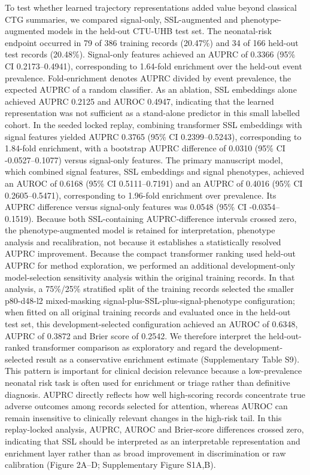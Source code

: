 \documentclass[utf8]{FrontiersinHarvard}
\begin{document}
To test whether learned trajectory representations added value beyond classical CTG summaries, we compared signal-only, SSL-augmented and phenotype-augmented models in the held-out CTU-UHB test set. The neonatal-risk endpoint occurred in 79 of 386 training records (20.47\%) and 34 of 166 held-out test records (20.48\%). Signal-only features achieved an AUPRC of 0.3366 (95\% CI 0.2173--0.4941), corresponding to 1.64-fold enrichment over the held-out event prevalence. Fold-enrichment denotes AUPRC divided by event prevalence, the expected AUPRC of a random classifier. As an ablation, SSL embeddings alone achieved AUPRC 0.2125 and AUROC 0.4947, indicating that the learned representation was not sufficient as a stand-alone predictor in this small labelled cohort. In the seeded locked replay, combining transformer SSL embeddings with signal features yielded AUPRC 0.3765 (95\% CI 0.2399--0.5243), corresponding to 1.84-fold enrichment, with a bootstrap AUPRC difference of 0.0310 (95\% CI -0.0527--0.1077) versus signal-only features. The primary manuscript model, which combined signal features, SSL embeddings and signal phenotypes, achieved an AUROC of 0.6168 (95\% CI 0.5111--0.7191) and an AUPRC of 0.4016 (95\% CI 0.2605--0.5471), corresponding to 1.96-fold enrichment over prevalence. Its AUPRC difference versus signal-only features was 0.0548 (95\% CI -0.0354--0.1519). Because both SSL-containing AUPRC-difference intervals crossed zero, the phenotype-augmented model is retained for interpretation, phenotype analysis and recalibration, not because it establishes a statistically resolved AUPRC improvement. Because the compact transformer ranking used held-out AUPRC for method exploration, we performed an additional development-only model-selection sensitivity analysis within the original training records. In that analysis, a 75\%/25\% stratified split of the training records selected the smaller p80-d48-l2 mixed-masking signal-plus-SSL-plus-signal-phenotype configuration; when fitted on all original training records and evaluated once in the held-out test set, this development-selected configuration achieved an AUROC of 0.6348, AUPRC of 0.3872 and Brier score of 0.2542. We therefore interpret the held-out-ranked transformer comparison as exploratory and regard the development-selected result as a conservative enrichment estimate (Supplementary Table S9). This pattern is important for clinical decision relevance because a low-prevalence neonatal risk task is often used for enrichment or triage rather than definitive diagnosis. AUPRC directly reflects how well high-scoring records concentrate true adverse outcomes among records selected for attention, whereas AUROC can remain insensitive to clinically relevant changes in the high-risk tail. In this replay-locked analysis, AUPRC, AUROC and Brier-score differences crossed zero, indicating that SSL should be interpreted as an interpretable representation and enrichment layer rather than as broad improvement in discrimination or raw calibration (Figure 2A--D; Supplementary Figure S1A,B).
\end{document}
